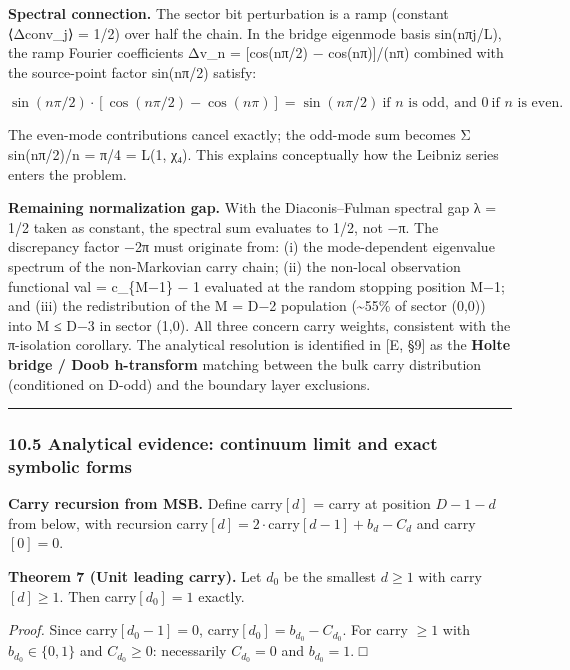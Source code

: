 \documentclass[
  11pt,
]{article}
\begin{document}
\textbf{Spectral connection.} The sector bit perturbation is a ramp (constant
⟨Δconv\_j⟩ = 1/2) over half the chain. In the bridge eigenmode basis sin(nπj/L),
the ramp Fourier coefficients Δv\_n = {[}cos(nπ/2) − cos(nπ){]}/(nπ) combined
with the source-point factor sin(nπ/2) satisfy:

\[\sin(n\pi/2) \cdot [\cos(n\pi/2) - \cos(n\pi)]
= \sin(n\pi/2)\ \text{if } n \text{ is odd},\ \text{and } 0\ \text{if } n \text{ is even}.\]

The even-mode contributions cancel exactly; the odd-mode sum becomes Σ
sin(nπ/2)/n = π/4 = L(1, χ₄). This explains conceptually how the Leibniz series
enters the problem.

\textbf{Remaining normalization gap.} With the Diaconis--Fulman spectral gap λ =
1/2 taken as constant, the spectral sum evaluates to 1/2, not −π. The
discrepancy factor −2π must originate from: (i) the mode-dependent eigenvalue
spectrum of the non-Markovian carry chain; (ii) the non-local observation
functional val = c\_\{M−1\} − 1 evaluated at the random stopping position M−1;
and (iii) the redistribution of the M = D−2 population (\textasciitilde55\% of
sector (0,0)) into M ≤ D−3 in sector (1,0). All three concern carry weights,
consistent with the π-isolation corollary. The analytical resolution is
identified in {[}E, §9{]} as the \textbf{Holte bridge / Doob h-transform}
matching between the bulk carry distribution (conditioned on D-odd) and the
boundary layer exclusions.

\begin{center}\rule{0.5\linewidth}{0.5pt}\end{center}

\subsubsection{10.5 Analytical evidence: continuum limit and exact symbolic
forms}\label{analytical-evidence-continuum-limit-and-exact-symbolic-forms}

\textbf{Carry recursion from MSB.} Define carry\([d]\) = carry at position
\(D-1-d\) from below, with recursion
carry\([d] = 2 \cdot\)carry\([d-1] + b_d - C_d\) and carry\([0] = 0\).

\textbf{Theorem 7 (Unit leading carry).} Let \(d_0\) be the smallest
\(d \geq 1\) with carry\([d] \geq 1\). Then carry\([d_0] = 1\) exactly.

\emph{Proof.} Since carry\([d_0-1] = 0\), carry\([d_0] = b_{d_0} - C_{d_0}\).
For carry \(\geq 1\) with \(b_{d_0} \in \lbrace{}0,1\rbrace{}\) and
\(C_{d_0} \geq 0\): necessarily \(C_{d_0} = 0\) and \(b_{d_0} = 1\). □
\end{document}
